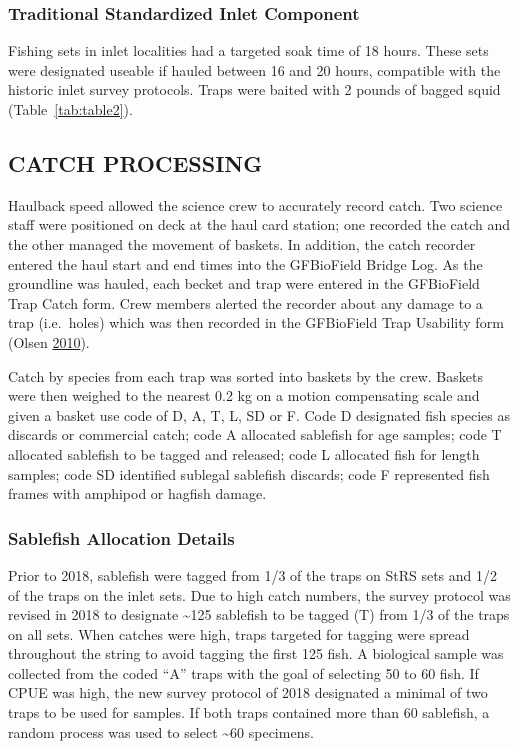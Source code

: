 \documentclass[12pt]{article}\usepackage[]{graphicx}\usepackage[]{color}
\begin{document}
\hypertarget{traditional-standardized-inlet-component}{%
\subsubsection{Traditional Standardized Inlet Component}\label{traditional-standardized-inlet-component}}

Fishing sets in inlet localities had a targeted soak time of 18 hours. These sets were designated useable if hauled between 16 and 20 hours, compatible with the historic inlet survey protocols. Traps were baited with 2 pounds of bagged squid (Table~\ref{tab:table2}).

\hypertarget{catch-processing}{%
\subsection{CATCH PROCESSING}\label{catch-processing}}

Haulback speed allowed the science crew to accurately record catch. Two science staff were positioned on deck at the haul card station; one recorded the catch and the other managed the movement of baskets. In addition, the catch recorder entered the haul start and end times into the GFBioField Bridge Log. As the groundline was hauled, each becket and trap were entered in the GFBioField Trap Catch form. Crew members alerted the recorder about any damage to a trap (i.e.~holes) which was then recorded in the GFBioField Trap Usability form (Olsen \protect\hyperlink{ref-Olsen2010}{2010}).

Catch by species from each trap was sorted into baskets by the crew. Baskets were then weighed to the nearest 0.2 kg on a motion compensating scale and given a basket use code of D, A, T, L, SD or F. Code D designated fish species as discards or commercial catch; code A allocated sablefish for age samples; code T allocated sablefish to be tagged and released; code L allocated fish for length samples; code SD identified sublegal sablefish discards; code F represented fish frames with amphipod or hagfish damage.

\hypertarget{sablefish-allocation-details}{%
\subsubsection{Sablefish Allocation Details}\label{sablefish-allocation-details}}

Prior to 2018, sablefish were tagged from 1/3 of the traps on StRS sets and 1/2 of the traps on the inlet sets. Due to high catch numbers, the survey protocol was revised in 2018 to designate \textasciitilde125 sablefish to be tagged (T) from 1/3 of the traps on all sets. When catches were high, traps targeted for tagging were spread throughout the string to avoid tagging the first 125 fish. A biological sample was collected from the coded ``A'' traps with the goal of selecting 50 to 60 fish. If CPUE was high, the new survey protocol of 2018 designated a minimal of two traps to be used for samples. If both traps contained more than 60 sablefish, a random process was used to select \textasciitilde60 specimens.
\end{document}
